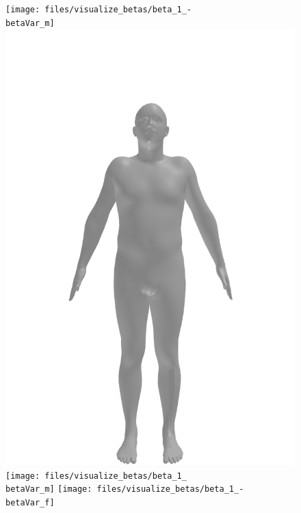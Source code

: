 \begin{figure}[ht!]
    \centering

    \begin{minipage}[b]{\textwidth}
        \centering
        \texttt{[image: files/visualize\_betas/beta\_1\_-\\betaVar\_m]}
        \includegraphics[width=\imgWidth]{files/visualize_betas/baseline_m}
        \texttt{[image: files/visualize\_betas/beta\_1\_\\betaVar\_m]}
        \linebreak
        \texttt{[image: files/visualize\_betas/beta\_1\_-\\betaVar\_f]}

\end{minipage}
\end{figure}
